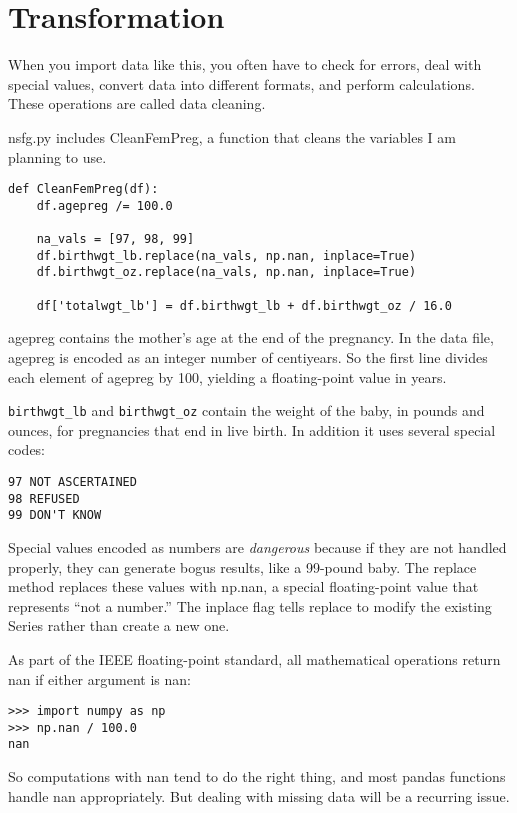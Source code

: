 \documentclass[]{book}
\begin{document}
\hypertarget{transformation}{%
\section{Transformation}\label{transformation}}

When you import data like this, you often
have to check for errors, deal with special values, convert data into
different formats, and perform calculations. These operations are called
data cleaning.

nsfg.py includes CleanFemPreg, a function that
cleans the variables I am planning to use.

\begin{verbatim}
def CleanFemPreg(df):
    df.agepreg /= 100.0

    na_vals = [97, 98, 99]
    df.birthwgt_lb.replace(na_vals, np.nan, inplace=True)
    df.birthwgt_oz.replace(na_vals, np.nan, inplace=True)

    df['totalwgt_lb'] = df.birthwgt_lb + df.birthwgt_oz / 16.0    
\end{verbatim}

agepreg contains the mother's age
at the end of the pregnancy. In the data file, agepreg is encoded as an integer
number of centiyears. So the first line divides each element of agepreg by 100, yielding a
floating-point value in years.

\texttt{birthwgt\_lb} and \texttt{birthwgt\_oz} contain
the weight of the baby, in pounds and ounces, for pregnancies that end
in live birth. In addition it uses several special codes:

\begin{verbatim}
97 NOT ASCERTAINED
98 REFUSED  
99 DON'T KNOW
\end{verbatim}

Special values encoded as numbers are
\emph{dangerous} because if they are not handled properly, they can generate
bogus results, like a 99-pound baby. The replace method replaces these
values with np.nan, a special
floating-point value that represents ``not a number.'' The inplace flag tells replace to modify the existing
Series rather than create a new one.

As part of the IEEE floating-point
standard, all mathematical operations return nan if either argument is nan:

\begin{verbatim}
>>> import numpy as np
>>> np.nan / 100.0
nan
\end{verbatim}

So computations with nan tend to do the right thing, and
most pandas functions handle nan appropriately. But dealing with
missing data will be a recurring issue.
\end{document}
